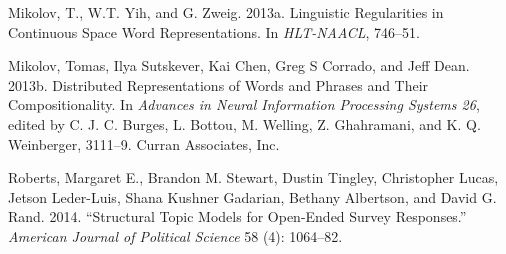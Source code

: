 \documentclass[11pt,letterpaper]{article}
\begin{document}

\hypertarget{ref-mikolovux5flinguisticux5f2013}{}
Mikolov, T., W.T. Yih, and G. Zweig. 2013a. Linguistic Regularities in
Continuous Space Word Representations. In \emph{HLT-NAACL}, 746--51.

\hypertarget{ref-mikolovux5fdistributedux5f2013}{}
Mikolov, Tomas, Ilya Sutskever, Kai Chen, Greg S Corrado, and Jeff Dean.
2013b. Distributed Representations of Words and Phrases and Their
Compositionality. In \emph{Advances in Neural Information Processing
Systems 26}, edited by C. J. C. Burges, L. Bottou, M. Welling, Z.
Ghahramani, and K. Q. Weinberger, 3111--9. Curran Associates, Inc.

\hypertarget{ref-robertsux5fstructuralux5f2014}{} Roberts, Margaret E., Brandon M. Stewart, Dustin Tingley, Christopher Lucas, Jetson Leder-Luis, Shana Kushner Gadarian, Bethany Albertson, and David G. Rand. 2014. ``Structural Topic Models for Open-Ended Survey Responses.'' \emph{American Journal of Political Science} 58 (4): 1064--82.
\end{document}
